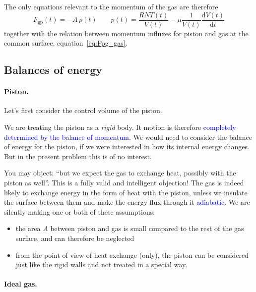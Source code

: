 \documentclass[a4paper,12pt,%
onecolumn,oneside,titlepage,%
british%
]{memoir}
\newcommand*{\di}{\mathrm{d}}%
\renewcommand*{\|}[1][]{\nonscript\:#1\vert\nonscript\:\mathopen{}}
\newcommand*{\sect}{\S}%
\renewcommand*{\autoref}[2]{\sidepar{\vspace{-1ex}\footnotesize{\color{blue}\faIcon{%
reply%
}\enspace\sect\,\ref{#1} page\,\pageref{#1}}}\textcolor{blue}{#2}}
\newcommand*{\yN}{N}
\newcommand*{\yFgp}{F_{\text{gp}}}
\newcommand*{\yvis}{\mu}%
\newcommand*{\yte}{T}%
\begin{document}
\medskip

The only equations relevant to the momentum of the gas are therefore
\begin{equation}
  \label{eq:gas_top_F}
  \yFgp(t) = -A\,p(t)
  \qquad
  p(t) = \frac{R \yN \yte(t)}{V(t)}  - \yvis \frac{1}{V(t)}\frac{\di V(t)}{\di t}
\end{equation}
together  with the relation between momentum influxes for piston and gas at the common surface, equation~\eqref{eq:Fpg_gas}.

\subsection{Balances of energy}
\label{sec:idealgas_ex_energy}

\paragraph{Piston.} Let's first consider the control volume of the piston.

We are treating the piston as a \emph{rigid} body. It motion is therefore \autoref{sec:rigid_bodies}{completely determined by the balance of momentum}. We would need to consider the balance of energy for the piston, if we were interested in how its internal energy changes. But in the present problem this is of no interest.

You may object: \enquote{but we expect the gas to exchange heat, possibly with the piston as well}. This is a fully valid and intelligent objection! The gas is indeed likely to exchange energy in the form of heat with the piston, unless we insulate the surface between them and make the energy flux through it \autoref{def:heatflux_adiabatic}{adiabatic}. We are silently making one or both of these assumptions:
\begin{itemize}
\item the area $A$ between piston and gas is small compared to the rest of the gas surface, and can therefore be neglected
\item from the point of view of heat exchange (only), the piston can be considered just like the rigid walls and not treated in a special way.
\end{itemize}

\bigskip

\paragraph{Ideal gas.}
\end{document}
